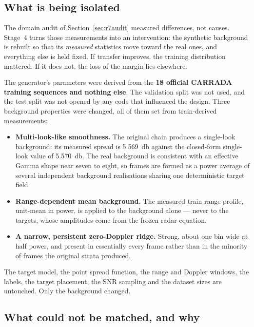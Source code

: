 \subsection{What is being isolated}

The domain audit of Section~\ref{sec:r7audit} measured differences, not causes. Stage~4 turns those
measurements into an intervention: the synthetic background is rebuilt so that its \emph{measured}
statistics move toward the real ones, and everything else is held fixed. If transfer improves, the
training distribution mattered. If it does not, the loss of the margin lies elsewhere.

The generator's parameters were derived from the \textbf{18 official CARRADA training sequences and
nothing else}. The validation split was not used, and the test split was not opened by any code that
influenced the design. Three background properties were changed, all of them set from train-derived
measurements:

\begin{itemize}
\itemsep2pt
\item \textbf{Multi-look-like smoothness.} The original chain produces a single-look background: its
measured spread is \SI{5.569}{\decibel} against the closed-form single-look value of
\SI{5.570}{\decibel}. The real background is consistent with an effective Gamma shape near seven to
eight, so frames are formed as a power average of several independent background realisations
sharing one deterministic target field.
\item \textbf{Range-dependent mean background.} The measured train range profile, unit-mean in
power, is applied to the background alone --- never to the targets, whose amplitudes come from the
frozen radar equation.
\item \textbf{A narrow, persistent zero-Doppler ridge.} Strong, about one bin wide at half power,
and present in essentially every frame rather than in the minority of frames the original strata
produced.
\end{itemize}

The target model, the point spread function, the range and Doppler windows, the labels, the target
placement, the SNR sampling and the dataset sizes are untouched. Only the background changed.

\subsection{What could not be matched, and why}

